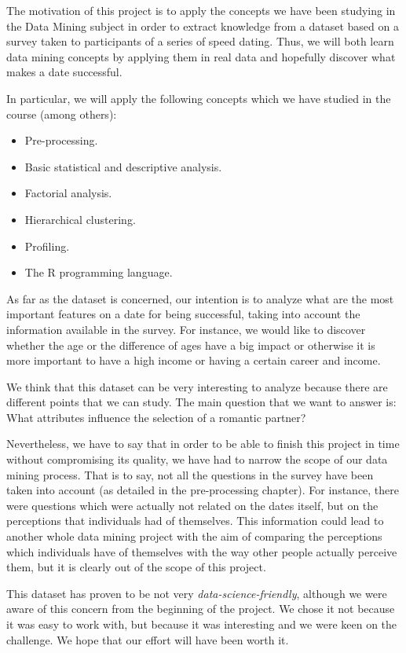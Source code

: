 
The motivation of this project is to apply the concepts we have been studying in the Data Mining subject in order to extract knowledge from a dataset based on a survey taken to participants of a series of speed dating. Thus, we will both learn data mining concepts by applying them in real data and hopefully discover what makes a date successful.

In particular, we will apply the following concepts which we have studied in the course (among others):
\begin{itemize}
    \item Pre-processing.
    \item Basic statistical and descriptive analysis.
    \item Factorial analysis.
    \item Hierarchical clustering.
    \item Profiling.
    \item The R programming language.
\end{itemize}

As far as the dataset is concerned, our intention is to analyze what are the most important features on a date for being successful, taking into account the information available in the survey. For instance, we would like to discover whether the age or the difference of ages have a big impact or otherwise it is more important to have a high income or having a certain career and income.

We think that this dataset can be very interesting to analyze because there are different points that we can study. The main question that we want to answer is: What attributes influence the selection of a romantic partner?

Nevertheless, we have to say that in order to be able to finish this project in time without compromising its quality, we have had to narrow the scope of our data mining process. That is to say, not all the questions in the survey have been taken into account (as detailed in the pre-processing chapter). For instance, there were questions which were actually not related on the dates itself, but on the perceptions that individuals had of themselves. This information could lead to another whole data mining project with the aim of comparing the perceptions which individuals have of themselves with the way other people actually perceive them, but it is clearly out of the scope of this project.

This dataset has proven to be not very \textit{data-science-friendly}, although we were aware of this concern from the beginning of the project. We chose it not because it was easy to work with, but because it was interesting and we were keen on the challenge. We hope that our effort will have been worth it.
